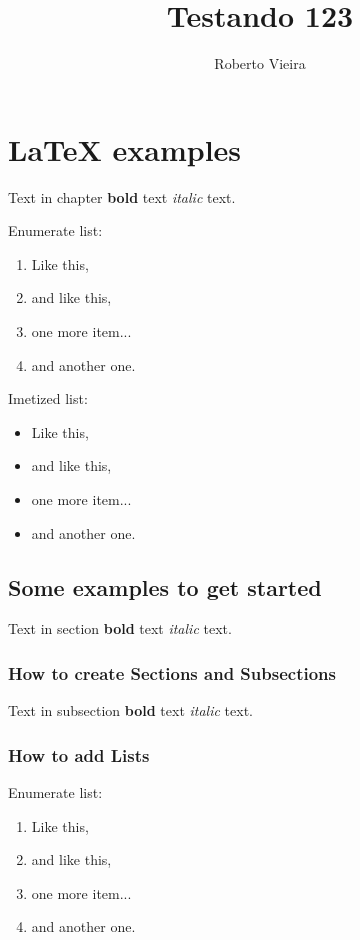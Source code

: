 \documentclass{article}
\title{Testando 123}
\author{Roberto Vieira}
\begin{document}
\chapter{LaTeX examples}

Text in chapter \textbf{bold} text \emph{italic} text.

Enumerate list:

\begin{enumerate}
\item Like this,
\item and like this,
\item one more item...
\item and another one.
\end{enumerate}

Imetized list:

\begin{itemize}
\item Like this,
\item and like this,
\item one more item...
\item and another one.
\end{itemize}

\section{Some examples to get started}

Text in section \textbf{bold} text \emph{italic} text.

\subsection{How to create Sections and Subsections}

Text in subsection \textbf{bold} text \emph{italic} text.

\subsection{How to add Lists}

Enumerate list:

\begin{enumerate}
\item Like this,
\item and like this,
\item one more item...
\item and another one.
\end{enumerate}
\end{document}
